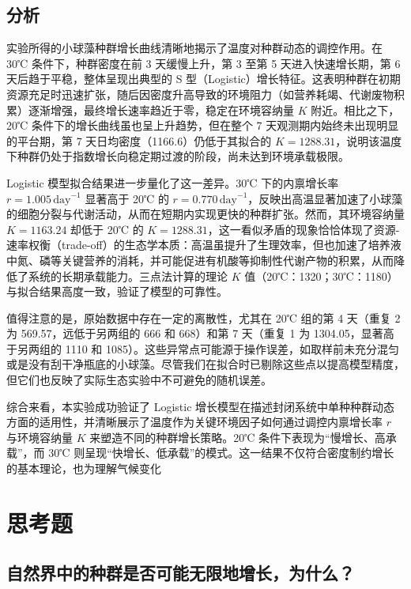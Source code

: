 \documentclass[10.5pt]{config}
\begin{document}
\subsection{分析}

实验所得的小球藻种群增长曲线清晰地揭示了温度对种群动态的调控作用。在 30℃ 条件下，种群密度在前 3 天缓慢上升，第 3 至第 5 天进入快速增长期，第 6 天后趋于平稳，整体呈现出典型的 S 型（Logistic）增长特征。这表明种群在初期资源充足时迅速扩张，随后因密度升高导致的环境阻力（如营养耗竭、代谢废物积累）逐渐增强，最终增长速率趋近于零，稳定在环境容纳量 $K$ 附近。相比之下，20℃ 条件下的增长曲线虽也呈上升趋势，但在整个 7 天观测期内始终未出现明显的平台期，第 7 天日均密度（1166.6）仍低于其拟合的 $K = 1288.31$，说明该温度下种群仍处于指数增长向稳定期过渡的阶段，尚未达到环境承载极限。

Logistic 模型拟合结果进一步量化了这一差异。30℃ 下的内禀增长率 $r = 1.005\,\text{day}^{-1}$ 显著高于 20℃ 的 $r = 0.770\,\text{day}^{-1}$，反映出高温显著加速了小球藻的细胞分裂与代谢活动，从而在短期内实现更快的种群扩张。然而，其环境容纳量 $K = 1163.24$ 却低于 20℃ 的 $K = 1288.31$，这一看似矛盾的现象恰恰体现了资源-速率权衡（trade-off）的生态学本质：高温虽提升了生理效率，但也加速了培养液中氮、磷等关键营养的消耗，并可能促进有机酸等抑制性代谢产物的积累，从而降低了系统的长期承载能力。三点法计算的理论 $K$ 值（20℃：1320；30℃：1180）与拟合结果高度一致，验证了模型的可靠性。

\clearpage

值得注意的是，原始数据中存在一定的离散性，尤其在 20℃ 组的第 4 天（重复 2 为 569.57，远低于另两组的 666 和 668）和第 7 天（重复 1 为 1304.05，显著高于另两组的 1110 和 1085）。这些异常点可能源于操作误差，如取样前未充分混匀或是没有刮干净瓶底的小球藻。尽管我们在拟合时已剔除这些点以提高模型精度，但它们也反映了实际生态实验中不可避免的随机误差。

综合来看，本实验成功验证了 Logistic 增长模型在描述封闭系统中单种种群动态方面的适用性，并清晰展示了温度作为关键环境因子如何通过调控内禀增长率 $r$ 与环境容纳量 $K$ 来塑造不同的种群增长策略。20℃ 条件下表现为“慢增长、高承载”，而 30℃ 则呈现“快增长、低承载”的模式。这一结果不仅符合密度制约增长的基本理论，也为理解气候变化

\section{思考题}

\subsection{自然界中的种群是否可能无限地增长，为什么？}
\end{document}
